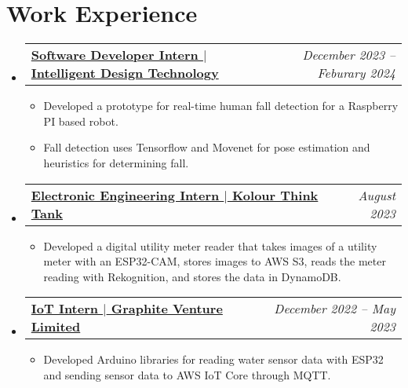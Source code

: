 \documentclass[letterpaper,12pt]{article}
\makeatletter
\newcommand{\resumeItem}[1]{
  \item\small{
    {#1 \vspace{-2pt}}
  }
}
\newcommand{\resumeSubheadingNoSkill}[2]{
    \item
    \begin{tabular*}{0.97\textwidth}[t]{l@{\extracolsep{\fill}}r}
      \textbf{#1} & \textit{\small #2} \\
    \end{tabular*}\vspace{-7pt}
}
\newcommand{\resumeSubHeadingListStart}{\begin{itemize}[leftmargin=0.05in, label={}]}
\newcommand{\resumeSubHeadingListEnd}{\end{itemize}}
\newcommand{\resumeItemListStart}{\begin{itemize}}
\newcommand{\resumeItemListEnd}{\end{itemize}\vspace{-5pt}}
\makeatother
\begin{document}
\section{Work Experience}
  \resumeSubHeadingListStart

    \resumeSubheadingNoSkill
        {\href{https://github.com/jamesyoung-15/FallDetection}{{Software Developer Intern $|$ Intelligent Design Technology}}}{December 2023 -- Feburary 2024}
        \resumeItemListStart 
          \resumeItem{\normalsize{Developed a prototype for real-time human fall detection for a Raspberry PI based robot.}}
          \resumeItem{\normalsize{Fall detection uses Tensorflow and Movenet for pose estimation and heuristics for determining fall.}}
        \resumeItemListEnd

    \resumeSubheadingNoSkill
        {\href{https://github.com/jamesyoung-15/ESP32Cam-MeterReading}{{Electronic Engineering Intern $|$ Kolour Think Tank}}}{August 2023}
        \resumeItemListStart 
          \resumeItem{\normalsize{Developed a digital utility meter reader that takes images of a utility meter with an ESP32-CAM, stores images to AWS S3, reads the meter reading with Rekognition, and stores the data in DynamoDB.}}
        \resumeItemListEnd

    \resumeSubheadingNoSkill
      {\href{https://github.com/jamesyoung-15/Internship-GraphiteVentureLimited}{{IoT Intern $|$ Graphite Venture Limited}}}{December 2022 -- May 2023}
      \resumeItemListStart 
        \resumeItem{\normalsize{Developed Arduino libraries for reading water sensor data with ESP32 and sending sensor data to AWS IoT Core through MQTT.}}
      \resumeItemListEnd



  \resumeSubHeadingListEnd

\end{document}
